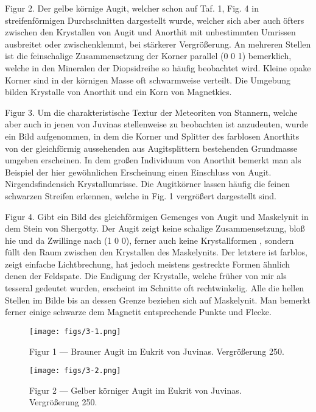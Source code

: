 \documentclass[a4paper, 12pt, oneside]{article}
\begin{document}
Figur 2. Der gelbe körnige Augit, welcher schon auf Taf. 1, Fig. 4 in streifenförmigen Durchschnitten dargestellt wurde, welcher sich aber auch öfters zwischen den Krystallen von Augit und Anorthit mit unbestimmten Umrissen ausbreitet oder zwischenklemmt, bei stärkerer Vergrößerung. An mehreren Stellen ist die feinschalige Zusammensetzung der Korner parallel (0 0 1) bemerklich, welche in den Mineralen der Diopsidreihe so häufig beobachtet wird. Kleine opake Korner sind in der körnigen Masse oft schwarmweise verteilt. Die Umgebung bilden Krystalle von Anorthit und ein Korn von Magnetkies.

Figur 3. Um die charakteristische Textur der Meteoriten von Stannern, welche aber auch in jenen von Juvinas stellenweise zu beobachten ist anzudeuten, wurde ein Bild aufgenommen, in dem die Korner und Splitter des farblosen Anorthits von der gleichförmig aussehenden aus Augitsplittern bestehenden Grundmasse umgeben erscheinen. In dem großen Individuum von Anorthit bemerkt man als Beispiel der hier gewöhnlichen Erscheinung einen Einschluss von Augit. Nirgendsfindensich Krystallumrisse. Die Augitkörner lassen häufig die feinen schwarzen Streifen erkennen, welche in Fig. 1 vergrößert dargestellt sind.

Figur 4. Gibt ein Bild des gleichförmigen Gemenges von Augit und Maskelynit in dem Stein von Shergotty. Der Augit zeigt keine schalige Zusammensetzung, bloß hie und da Zwillinge nach (1 0 0), ferner auch keine Krystallformen , sondern füllt den Raum zwischen den Krystallen des Maskelynits. Der letztere ist farblos, zeigt einfache Lichtbrechung, hat jedoch meistens gestreckte Formen ähnlich denen der Feldspate. Die Endigung der Krystalle, welche früher von mir als tesseral gedeutet wurden, erscheint im Schnitte oft rechtwinkelig. Alle die hellen Stellen im Bilde bis an dessen Grenze beziehen sich auf Maskelynit. Man bemerkt ferner einige schwarze dem Magnetit entsprechende Punkte und Flecke.
\clearpage

\vspace*{\fill}
\begin{figure}[H]
\centering
\texttt{[image: figs/3-1.png]}
\caption{\small Figur 1 --- Brauner Augit im Eukrit von Juvinas. Vergrößerung 250.}
\end{figure}
\vspace*{\fill}
\clearpage

\vspace*{\fill}
\begin{figure}[H]
\centering
\texttt{[image: figs/3-2.png]}
\caption{\small Figur 2 --- Gelber körniger Augit im Eukrit von Juvinas. Vergrößerung 250.}
\end{figure}
\vspace*{\fill}
\clearpage
\end{document}
